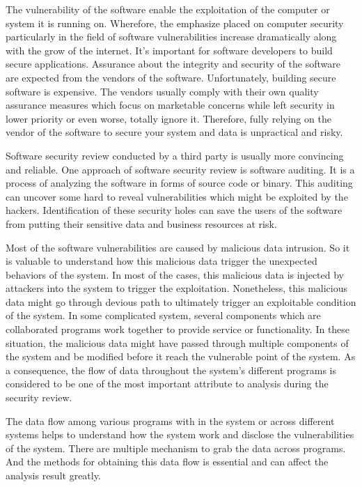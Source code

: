 \label{chapter:introduction}
The vulnerability of the software enable the exploitation of the computer or system it is running on. Wherefore, the emphasize placed on computer security particularly in the field of software vulnerabilities increase dramatically along with the grow of the internet. It's important for software developers to build secure applications. Assurance about the integrity and security of the software are expected from the vendors of the software. Unfortunately, building secure software is expensive. The vendors usually comply with their own quality assurance measures which focus on marketable concerns while left security in lower priority or even worse, totally ignore it. Therefore, fully relying on the vendor of the software to secure your system and data is unpractical and risky.\cite{dowd_art_2006}

Software security review conducted by a third party is usually more convincing and reliable. One approach of software security review is software auditing. It is a process of analyzing the software in forms of source code or binary. This auditing can uncover some hard to reveal vulnerabilities which might be exploited by the hackers. Identification of these security holes can save the users of the software from putting their sensitive data and business resources at risk.\cite{dowd_art_2006}

Most of the software vulnerabilities are caused by malicious data intrusion. So it is valuable to understand how this malicious data trigger the unexpected behaviors of the system. In most of the cases, this malicious data is injected by attackers into the system to trigger the exploitation. Nonetheless, this malicious data might go through devious path to ultimately trigger an exploitable condition of the system. In some complicated system, several components which are collaborated programs work together to provide service or functionality. In these situation, the malicious data might have passed through multiple components of the system and be modified before it reach the vulnerable point of the system. As a consequence, the flow of data throughout the system's different programs is considered to be one of the most important attribute to analysis during the security review.\cite{dowd_art_2006}

The data flow among various programs with in the system or across different systems helps to understand how the system work and disclose the vulnerabilities of the system. There are multiple mechanism to grab the data across programs. And the methods for obtaining this data flow is essential and can affect the analysis result greatly. 

